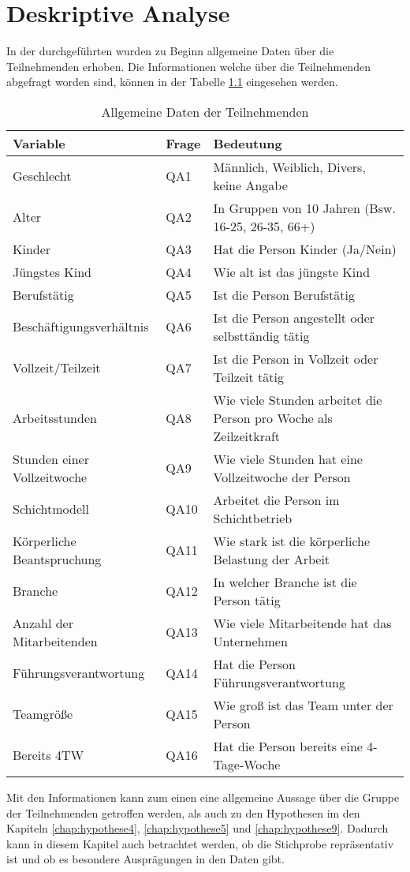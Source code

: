 \chapter{Deskriptive Analyse}

In der durchgeführten wurden zu Beginn allgemeine Daten über die Teilnehmenden erhoben.
Die Informationen welche über die Teilnehmenden abgefragt worden sind, können in der Tabelle
\ref{tab:allgemeine_daten} eingesehen werden.

\begin{table}[h]
    \centering
    \begin{tabular}{|l|l|p{8cm}|}
        \hline
        \textbf{Variable} & \textbf{Frage} & \textbf{Bedeutung}\\
        \hline
        Geschlecht & QA1 & Männlich, Weiblich, Divers, keine Angabe\\
        Alter & QA2 & In Gruppen von 10 Jahren (Bsw. 16-25, 26-35, 66+)\\
        Kinder & QA3 & Hat die Person Kinder (Ja/Nein)\\
        Jüngstes Kind & QA4 & Wie alt ist das jüngste Kind\\
        Berufstätig & QA5 & Ist die Person Berufstätig\\
        Beschäftigungsverhältnis & QA6 & Ist die Person angestellt oder selbsttändig tätig\\
        Vollzeit/Teilzeit & QA7 & Ist die Person in Vollzeit oder Teilzeit tätig\\
        Arbeitsstunden & QA8 & Wie viele Stunden arbeitet die Person pro Woche als Zeilzeitkraft\\
        Stunden einer Vollzeitwoche & QA9 & Wie viele Stunden hat eine Vollzeitwoche der Person\\
        Schichtmodell & QA10 & Arbeitet die Person im Schichtbetrieb\\
        Körperliche Beantspruchung & QA11 & Wie stark ist die körperliche Belastung der Arbeit\\
        Branche & QA12 & In welcher Branche ist die Person tätig\\
        Anzahl der Mitarbeitenden & QA13 & Wie viele Mitarbeitende hat das Unternehmen\\
        Führungsverantwortung & QA14 & Hat die Person Führungsverantwortung\\
        Teamgröße & QA15 & Wie groß ist das Team unter der Person\\
        Bereits 4TW & QA16 & Hat die Person bereits eine 4-Tage-Woche\\
        \hline
    \end{tabular}
    \caption{Allgemeine Daten der Teilnehmenden}
    \label{tab:allgemeine_daten}
\end{table}

Mit den Informationen kann zum einen eine allgemeine Aussage über die Gruppe der Teilnehmenden 
getroffen werden, als auch zu den Hypothesen im den Kapiteln \ref{chap:hypothese4},
\ref{chap:hypothese5} und \ref{chap:hypothese9}. Dadurch kann in diesem Kapitel auch betrachtet
werden, ob die Stichprobe repräsentativ ist und ob es besondere Ausprägungen in den Daten gibt.
 
